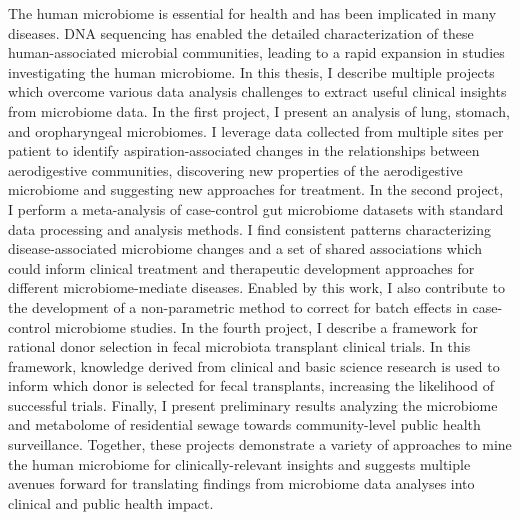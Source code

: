 
The human microbiome is essential for health and has been implicated in many diseases.
DNA sequencing has enabled the detailed characterization of these human-associated microbial communities, leading to a rapid expansion in studies investigating the human microbiome.
In this thesis, I describe multiple projects which overcome various data analysis challenges to extract useful clinical insights from microbiome data.
In the first project, I present an analysis of lung, stomach, and oropharyngeal microbiomes.
I leverage data collected from multiple sites per patient to identify aspiration-associated changes in the relationships between aerodigestive communities, discovering new properties of the aerodigestive microbiome and suggesting new approaches for treatment.
In the second project, I perform a meta-analysis of case-control gut microbiome datasets with standard data processing and analysis methods.
I find consistent patterns characterizing disease-associated microbiome changes and a set of shared associations which could inform clinical treatment and therapeutic development approaches for different microbiome-mediate diseases.
Enabled by this work, I also contribute to the development of a non-parametric method to correct for batch effects in case-control microbiome studies.
In the fourth project, I describe a framework for rational donor selection in fecal microbiota transplant clinical trials.
In this framework, knowledge derived from clinical and basic science research is used to inform which donor is selected for fecal transplants, increasing the likelihood of successful trials.
Finally, I present preliminary results analyzing the microbiome and metabolome of residential sewage towards community-level public health surveillance.  
Together, these projects demonstrate a variety of approaches to mine the human microbiome for clinically-relevant insights and suggests multiple avenues forward for translating findings from microbiome data analyses into clinical and public health impact.

